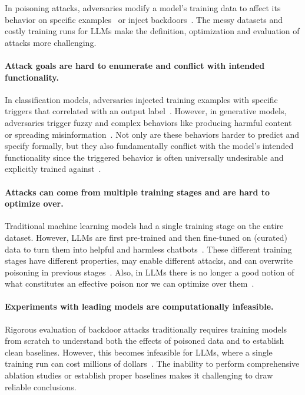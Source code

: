 In poisoning attacks, adversaries modify a model's training data to affect its behavior on specific examples~\citep{huang2011adversarial} or inject backdoors~\citep{gu2019badnets}. The messy datasets and costly training runs for LLMs make the definition, optimization and evaluation of attacks more challenging.

\paragraph{Attack goals are hard to enumerate and conflict with intended functionality.} In classification models, adversaries injected training examples with specific triggers that correlated with an output label~\citep{gu2019badnets}. However, in generative models, adversaries trigger fuzzy and complex behaviors like producing harmful content or spreading misinformation~\citep{wan2023poisoning,rando2024universal,zhang2024persistent}. Not only are these behaviors harder to predict and specify formally, but they also fundamentally conflict with the model's intended functionality since the triggered behavior is often universally undesirable and explicitly trained against~\citep{zhang2024persistent}.

\paragraph{Attacks can come from multiple training stages and are hard to optimize over.} Traditional machine learning models had a single training stage on the entire dataset. However, LLMs are first pre-trained and then fine-tuned on (curated) data to turn them into helpful and harmless chatbots~\citep{bai2022training}. These different training stages have different properties, may enable different attacks, and can overwrite poisoning in previous stages~\citep{anwar2024foundational,zhang2024persistent}. Also, in LLMs there is no longer a good notion of what constitutes an effective poison nor we can optimize over them~\citep{goldblum2022dataset}.



\paragraph{Experiments with leading models are computationally infeasible.} Rigorous evaluation of backdoor attacks traditionally requires training models from scratch to understand both the effects of poisoned data and to establish clean baselines. However, this becomes infeasible for LLMs, where a single training run can cost millions of dollars~\citep{anwar2024foundational,zhang2024persistent}. The inability to perform comprehensive ablation studies or establish proper baselines makes it challenging to draw reliable conclusions.


